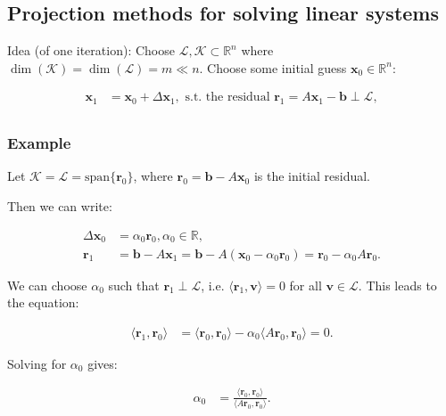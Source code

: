 \subsection{Projection methods for solving linear systems}

Idea (of one iteration): Choose $\mathcal{L}, \mathcal{K} \subset \mathbb{R}^n$ where $\dim(\mathcal{K}) = \dim(\mathcal{L}) = m \ll n$.
Choose some initial guess $\mathbf{x}_0 \in \mathbb{R}^n$:

\begin{align*}
    \mathbf{x}_1 & = \mathbf{x}_0 + \Delta \mathbf{x}_1, \text{ s.t. the residual } \mathbf{r}_1 = A\mathbf{x}_1 - \mathbf{b} \perp \mathcal{L}, \\
\end{align*}

\subsubsection*{Example}

Let $\mathcal{K} = \mathcal{L} = \text{span}\{\mathbf{r}_0\}$, where $\mathbf{r}_0 = \mathbf{b} - A\mathbf{x}_0$ is the initial residual.

Then we can write:

\begin{align*}
    \Delta \mathbf{x}_0 & = \alpha_0 \mathbf{r}_0, \alpha_0 \in \mathbb{R},                                                                            \\
    \mathbf{r}_1        & = \mathbf{b} - A\mathbf{x}_1 = \mathbf{b} - A(\mathbf{x}_0 - \alpha_0 \mathbf{r}_0) = \mathbf{r}_0 - \alpha_0 A\mathbf{r}_0.
\end{align*}

We can choose $\alpha_0$ such that $\mathbf{r}_1 \perp \mathcal{L}$, i.e. $\langle \mathbf{r}_1, \mathbf{v} \rangle = 0$ for all $\mathbf{v} \in \mathcal{L}$.
This leads to the equation:

\begin{align*}
    \langle \mathbf{r}_1, \mathbf{r}_0 \rangle & = \langle \mathbf{r}_0, \mathbf{r}_0 \rangle - \alpha_0 \langle A\mathbf{r}_0, \mathbf{r}_0 \rangle = 0.
\end{align*}

Solving for $\alpha_0$ gives:

\begin{align*}
    \alpha_0 & = \frac{\langle \mathbf{r}_0, \mathbf{r}_0 \rangle}{\langle A\mathbf{r}_0, \mathbf{r}_0 \rangle}.
\end{align*}

